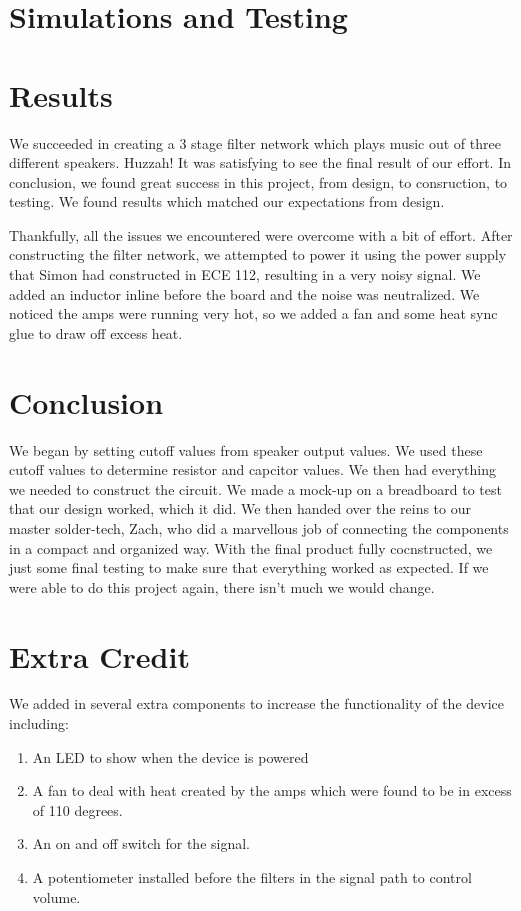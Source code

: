 \documentclass{article}
\begin{document}
\section*{Simulations and Testing}

\section*{Results}
We succeeded in creating a 3 stage filter network which plays music out of 
three different speakers. Huzzah! It was satisfying to see the final result
of our effort. In conclusion, we found great success in this project, from design, 
to consruction, to testing. We found results which matched our expectations 
from design. 

Thankfully, all the issues we encountered were overcome with a bit of effort. 
After constructing the filter network, we attempted to power it using the 
power supply that Simon had constructed in ECE 112, resulting in a very noisy 
signal. We added an inductor inline before the board and the noise was 
neutralized. We noticed the amps were running very hot, so we added a fan and 
some heat sync glue to draw off excess heat. 


\section*{Conclusion}
We began by setting cutoff values from speaker output values. We used these 
cutoff values to determine resistor and capcitor values. We then had 
everything we needed to construct the circuit. We made a mock-up on a 
breadboard to test that our design worked, which it did. We then handed 
over the reins to our master solder-tech, Zach, who did a marvellous 
job of connecting the components in a compact and organized way. With 
the final product fully cocnstructed, we just some final testing to 
make sure that everything worked as expected. If we were able to do this 
project again, there isn't much we would change. 

\section*{Extra Credit}
We added in several extra components to increase the functionality of the 
device including:
\begin{enumerate}
\item An LED to show when the device is powered
\item A fan to deal with heat created by the amps which were found to be in
 excess of 110 degrees.
\item An on and off switch for the signal. 
\item A potentiometer installed before the filters in the signal path to 
control volume.
\end{enumerate}
\end{document}
